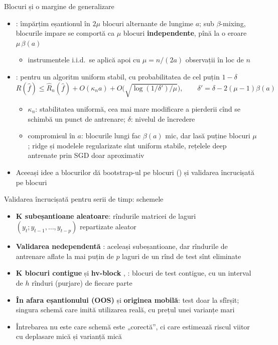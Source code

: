 \begin{frame}{Blocuri și o margine de generalizare}
\itemsize{\small}
\begin{itemize}
    \item {}: împărțim eșantionul în $2\mu$ blocuri alternante de lungime $a$; sub $\beta$-mixing, blocurile impare se comportă ca $\mu$ blocuri \textbf{independente}, pînă la o eroare $\mu\,\beta(a)$
    \begin{itemize}
        \item instrumentele i.i.d.\ se aplică apoi cu $\mu = n/(2a)$ observații în loc de $n$
    \end{itemize}
    \item {}: pentru un algoritm uniform stabil, cu probabilitatea de cel puțin $1 - \delta$
    \[ R(\hat f) \le \hat R_n(\hat f) + O(\kappa_n a) + O\Big(\sqrt{\log(1/\delta')/\mu}\Big), \qquad \delta' = \delta - 2(\mu - 1)\beta(a) \]
    \begin{itemize}
        \item $\kappa_n$: stabilitatea uniformă, cea mai mare modificare a pierderii cînd se schimbă un punct de antrenare; $\delta$: nivelul de încredere
        \item compromisul în $a$: blocurile lungi fac $\beta(a)$ mic, dar lasă puține blocuri $\mu$; ridge și modelele regularizate sînt uniform stabile, rețelele deep antrenate prin SGD doar aproximativ
    \end{itemize}
    \item Aceeași idee a blocurilor dă bootstrap-ul pe blocuri () și validarea încrucișată pe blocuri
\end{itemize}
\end{frame}

\begin{frame}{Validarea încrucișată pentru serii de timp: schemele}
\itemsize{\small}
\begin{itemize}
    \item \textbf{K subeșantioane aleatoare}: rîndurile matricei de laguri $(y_t; y_{t-1},\dots,y_{t-p})$ repartizate aleator
    \item \textbf{Validarea nedependentă} : aceleași subeșantioane, dar rîndurile de antrenare aflate la mai puțin de $p$ laguri de un rînd de test sînt eliminate
    \item \textbf{K blocuri contigue} și \textbf{hv-block} , : blocuri de test contigue, cu un interval de $h$ rînduri (purjare) de fiecare parte
    \item \textbf{În afara eșantionului (OOS)} și \textbf{originea mobilă}: test doar la sfîrșit; singura schemă care imită utilizarea reală, cu prețul unei varianțe mari
    \item Întrebarea nu este care schemă este „corectă”, ci care estimează riscul viitor cu deplasare mică și varianță mică
\end{itemize}
\end{frame}

